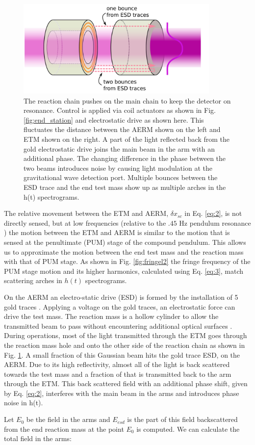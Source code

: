 \documentclass[12pt]{iopart}
\begin{document}
 \begin{figure}[h]
    \centering
    \includegraphics[width=10cm]{mirror-diag1.png}
    \caption{The reaction chain pushes on the main chain  to keep the detector on resonance. Control is applied via coil actuators as shown in Fig. \ref{fig:end_station} and electrostatic drive as shown here. This fluctuates the distance between the AERM shown on the left and ETM shown on the right. A part of the light reflected back from the gold electrostatic drive joins the main beam in the arm with an additional phase. The changing difference in the phase between the two beams introduces noise by causing light modulation at the gravitational wave detection port. Multiple bounces between the ESD trace and the end test mass show up as multiple arches in the h(t) spectrograms.}
    \label{fig:mirror_diag}
\end{figure}
The relative movement between the ETM and AERM, ${\delta x_{sc}}$ in Eq. \ref{eq:2}, is not directly sensed, but at low frequencies (relative to the $.45$ Hz pendulum resonance ) the motion between the ETM and AERM is similar to the motion that is sensed at the penultimate (PUM) stage of the compound pendulum. This allows us to approximate the motion between the end test mass and the reaction mass with that of PUM stage.  As shown in Fig. \ref{fig:fringel2} the fringe frequency of the PUM stage motion and its higher harmonics, calculated using Eq. \ref{eq:3}, match scattering arches in $h(t)$ spectrograms.
 
\par

On the AERM an electro-static drive (ESD) is formed by the installation of 5 gold traces \cite{esd_schematic}. Applying a voltage on the gold traces,  an electrostatic force can drive the test mass. The reaction mass is a hollow cylinder to allow the transmitted beam to pass without encountering additional optical surfaces \cite{aerm_schematic}. During operations, most of the light transmitted through the ETM goes through the reaction mass hole and onto the other side of the reaction chain as shown in Fig. \ref{fig:mirror_diag}. A small fraction of this Gaussian beam hits the gold trace ESD, on the AERM. Due to its high reflectivity, almost all of the light is back scattered towards the test mass and a fraction of that is transmitted back to the arm through the ETM. This back scattered field with an additional phase shift, given by Eq. \ref{eq:2}, interferes with the main beam in the arms and introduces phase noise in h(t).
\par
Let $E_{0}$ be the field in the arms and $E_{esd}$ is the part of this field backscattered from the end reaction mass at the point $E_{0}$ is computed. We can calculate the total field in the arms:
\end{document}
